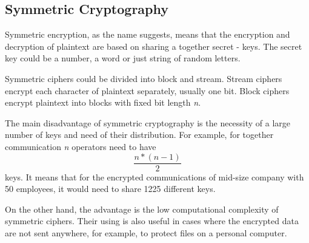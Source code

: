 \documentclass[
  digital, %
  notable,   %
  lof,     %
  lot,     %
]{fithesis3}
\begin{document}
\subsection{Symmetric Cryptography}
Symmetric encryption, as the name suggests, means that the encryption and decryption of 
plaintext are based on sharing a together secret - keys. The secret key could be a number, a 
word or just string of random letters. %

Symmetric ciphers could be divided into block and stream. Stream ciphers encrypt each 
character of plaintext separately, usually one bit. Block ciphers encrypt plaintext into 
blocks with fixed bit length \textit{n}. %

The main disadvantage of symmetric cryptography is the necessity of a large number of keys 
and need of their distribution. For example, for together communication \textit{n} operators 
need to have \[ \frac{n * (n - 1)}{2}\] keys. It means that for the encrypted communications 
of mid-size company with 50 employees, it would need to share 1225 different keys. 

On the other hand, the advantage is the low computational complexity of symmetric ciphers. 
Their using is also useful in cases where the encrypted data are not sent anywhere, for 
example, to protect files on a personal computer.
 
\end{document}
